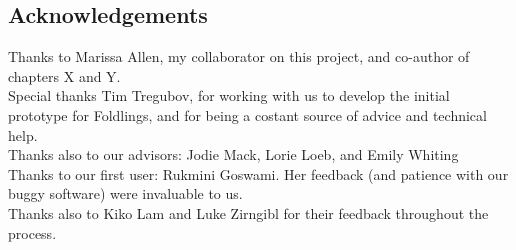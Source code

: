 \pagestyle{plain}
\begin{center}


\section*{Acknowledgements}

Thanks to Marissa Allen, my collaborator on this project, and co-author of chapters X and Y. \\
Special thanks Tim Tregubov, for working with us to develop the initial prototype for Foldlings, and for being a costant source of advice and technical help. \\
Thanks also to our advisors: Jodie Mack, Lorie Loeb, and Emily Whiting \\
Thanks to our first user: Rukmini Goswami.  Her feedback (and patience with our buggy software) were invaluable to us. \\
Thanks also to Kiko Lam and Luke Zirngibl for their feedback throughout the process.
\end{center}



\cleardoublepage
